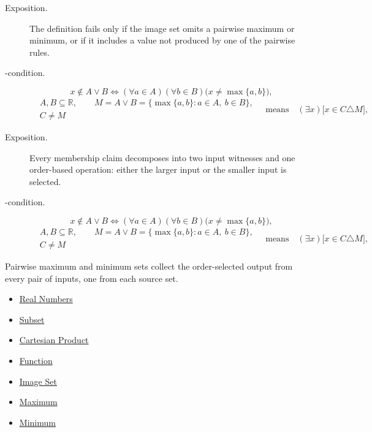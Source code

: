 \begin{remark*}
\begin{description}
\item[Exposition.]
The definition fails only if the image set omits a pairwise maximum or minimum,
or if it includes a value not produced by one of the pairwise rules.


  \item[\exists-condition.]
  \[
x\notin A\vee B
\Longleftrightarrow
(\forall a\in A)(\forall b\in B)\bigl(x\neq\max\{a,b\}\bigr),
\]
\[
\begin{aligned}
&A,B\subseteq\mathbb{R},\qquad
M=A\vee B=\{\max\{a,b\}:a\in A,\ b\in B\},\\
&C\ne M
\end{aligned}
\quad\text{means}\quad
(\exists x)\bigl[x\in C\triangle M\bigr],
\]
\end{description}
\end{remark*}

\begin{remark*}
\begin{description}
\item[Exposition.]
Every membership claim decomposes into two input witnesses and one order-based
operation: either the larger input or the smaller input is selected.


  \item[\exists-condition.]
  \[
x\notin A\vee B
\Longleftrightarrow
(\forall a\in A)(\forall b\in B)\bigl(x\neq\max\{a,b\}\bigr),
\]
\[
\begin{aligned}
&A,B\subseteq\mathbb{R},\qquad
M=A\vee B=\{\max\{a,b\}:a\in A,\ b\in B\},\\
&C\ne M
\end{aligned}
\quad\text{means}\quad
(\exists x)\bigl[x\in C\triangle M\bigr],
\]
\end{description}
\end{remark*}

\begin{remark*}[Interpretation]
Pairwise maximum and minimum sets collect the order-selected output from
every pair of inputs, one from each source set.
\end{remark*}

\begin{dependencies}
\begin{itemize}
  \item \hyperref[def:reals]{Real Numbers}
  \item \hyperref[def:subset]{Subset}
  \item \hyperref[def:cartesian-product]{Cartesian Product}
  \item \hyperref[def:function]{Function}
  \item \hyperref[def:image-set]{Image Set}
  \item \hyperref[def:maximum]{Maximum}
  \item \hyperref[def:minimum]{Minimum}
\end{itemize}
\end{dependencies}

